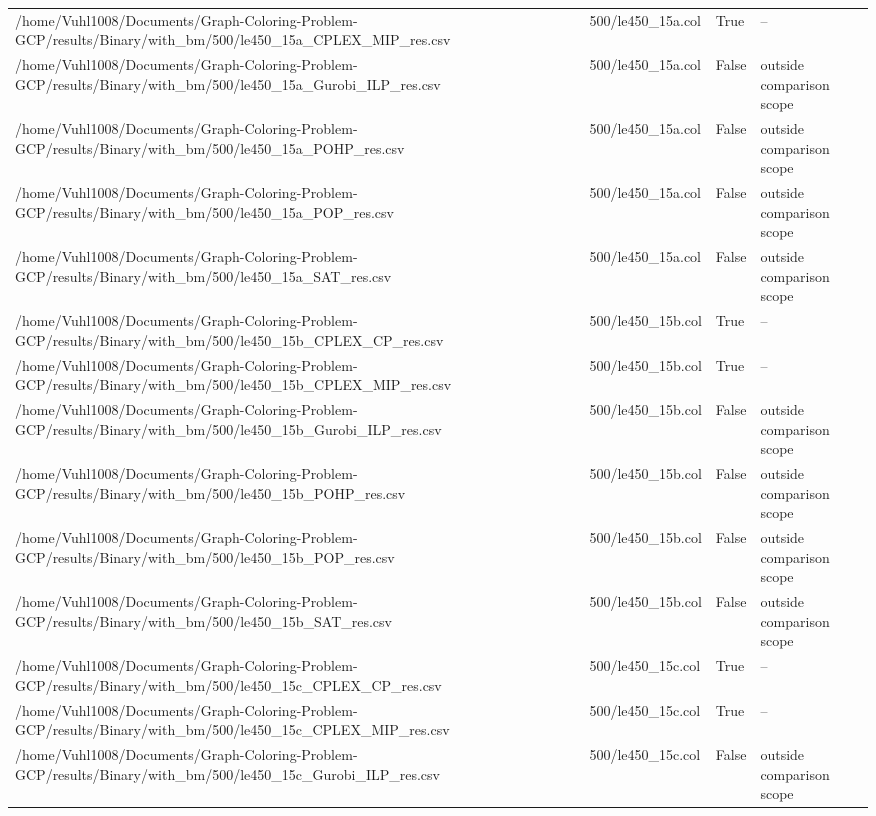 \begin{table}[htbp]
\begin{tabular}{llll}
/home/Vuhl1008/Documents/Graph-Coloring-Problem-GCP/results/Binary/with\_bm/500/le450\_15a\_CPLEX\_MIP\_res.csv & 500/le450\_15a.col & True & -- \\
/home/Vuhl1008/Documents/Graph-Coloring-Problem-GCP/results/Binary/with\_bm/500/le450\_15a\_Gurobi\_ILP\_res.csv & 500/le450\_15a.col & False & outside comparison scope \\
/home/Vuhl1008/Documents/Graph-Coloring-Problem-GCP/results/Binary/with\_bm/500/le450\_15a\_POHP\_res.csv & 500/le450\_15a.col & False & outside comparison scope \\
/home/Vuhl1008/Documents/Graph-Coloring-Problem-GCP/results/Binary/with\_bm/500/le450\_15a\_POP\_res.csv & 500/le450\_15a.col & False & outside comparison scope \\
/home/Vuhl1008/Documents/Graph-Coloring-Problem-GCP/results/Binary/with\_bm/500/le450\_15a\_SAT\_res.csv & 500/le450\_15a.col & False & outside comparison scope \\
/home/Vuhl1008/Documents/Graph-Coloring-Problem-GCP/results/Binary/with\_bm/500/le450\_15b\_CPLEX\_CP\_res.csv & 500/le450\_15b.col & True & -- \\
/home/Vuhl1008/Documents/Graph-Coloring-Problem-GCP/results/Binary/with\_bm/500/le450\_15b\_CPLEX\_MIP\_res.csv & 500/le450\_15b.col & True & -- \\
/home/Vuhl1008/Documents/Graph-Coloring-Problem-GCP/results/Binary/with\_bm/500/le450\_15b\_Gurobi\_ILP\_res.csv & 500/le450\_15b.col & False & outside comparison scope \\
/home/Vuhl1008/Documents/Graph-Coloring-Problem-GCP/results/Binary/with\_bm/500/le450\_15b\_POHP\_res.csv & 500/le450\_15b.col & False & outside comparison scope \\
/home/Vuhl1008/Documents/Graph-Coloring-Problem-GCP/results/Binary/with\_bm/500/le450\_15b\_POP\_res.csv & 500/le450\_15b.col & False & outside comparison scope \\
/home/Vuhl1008/Documents/Graph-Coloring-Problem-GCP/results/Binary/with\_bm/500/le450\_15b\_SAT\_res.csv & 500/le450\_15b.col & False & outside comparison scope \\
/home/Vuhl1008/Documents/Graph-Coloring-Problem-GCP/results/Binary/with\_bm/500/le450\_15c\_CPLEX\_CP\_res.csv & 500/le450\_15c.col & True & -- \\
/home/Vuhl1008/Documents/Graph-Coloring-Problem-GCP/results/Binary/with\_bm/500/le450\_15c\_CPLEX\_MIP\_res.csv & 500/le450\_15c.col & True & -- \\
/home/Vuhl1008/Documents/Graph-Coloring-Problem-GCP/results/Binary/with\_bm/500/le450\_15c\_Gurobi\_ILP\_res.csv & 500/le450\_15c.col & False & outside comparison scope \\

\end{tabular}
\end{table}
